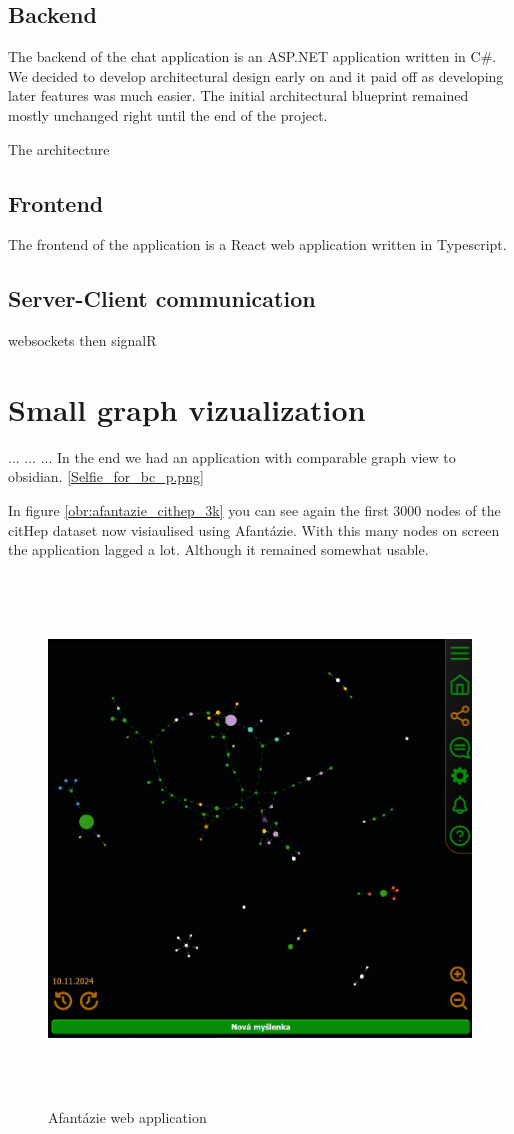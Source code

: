 \subsection{Backend}
The backend of the chat application is an ASP.NET application written in C\#.
We decided to develop architectural design early on and it paid off as developing later features was much easier. 
The initial architectural blueprint remained mostly unchanged right until the end of the project.

The architecture 


\subsection{Frontend}
The frontend of the application is a React web application written in Typescript. 

\subsection{Server-Client communication}
websockets then signalR

\section{Small graph vizualization}
...
...
...
In the end we had an application with comparable graph view to obsidian. \ref{Selfie_for_bc_p.png} 

In figure \ref{obr:afantazie_cithep_3k} you can see again the first 3000 nodes of the citHep dataset now visiaulised using Afantázie.
With this many nodes on screen the application lagged a lot. Although it remained somewhat usable.

\begin{figure}[p]\centering
    \includegraphics[width=140mm, height=140mm]{img/Selfie_for_bc_p.png}
    \caption{Afantázie web application}
    \label{obr:afantazie_selfie}
\end{figure}

